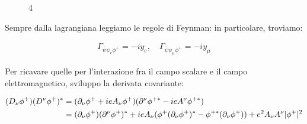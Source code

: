 \documentclass[11pt]{report}
\begin{document}
\begin{figure}
\begin{multicols}{4}
\begin{center}
        \end{center}
    \columnbreak
        \begin{center}
        \end{center}
    \end{multicols}
\end{figure}

Sempre dalla lagrangiana leggiamo le regole di Feynman: in particolare, troviamo: 

\begin{align}
    \Gamma_{\bar{\psi}\psi_e \phi^+} = -iy_e, \quad \Gamma_{\bar{\psi}\psi_\mu \phi^+} = -iy_\mu
\end{align}

Per ricavare quelle per l'interazione fra il campo scalare e il campo elettromagnetico, sviluppo la derivata covariante: 

\begin{align}
    (D_\nu \phi^+)(D^\nu \phi^+)^* &= (\partial_\nu \phi^+ +ieA_\nu \phi^+)(\partial^\nu \phi^{+*} -ieA^\nu \phi^{+*}) \notag \\
    &= (\partial_\nu \phi^+)(\partial^\nu \phi^+)^* +ieA_\nu (\phi^+(\partial_\nu \phi^+)^* - \phi^{+*}(\partial_\nu\phi^+)) + e^2 A_\nu A^\nu |\phi^+|^2
\end{align}
\end{document}
